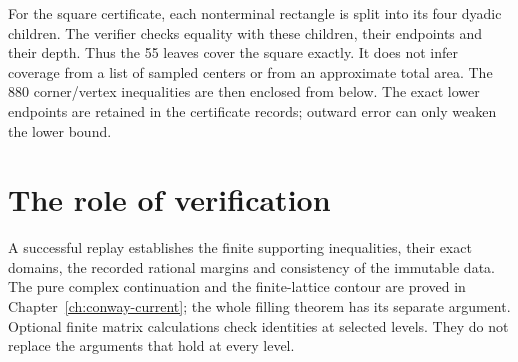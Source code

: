 For the square certificate, each nonterminal rectangle is split into its four dyadic children. The verifier checks equality with these children, their endpoints and their depth. Thus the 55 leaves cover the square exactly. It does not infer coverage from a list of sampled centers or from an approximate total area. The 880 corner/vertex inequalities are then enclosed from below. The exact lower endpoints are retained in the certificate records; outward error can only weaken the lower bound.

\section{The role of verification}
A successful replay establishes the finite supporting inequalities, their exact domains, the recorded rational margins and consistency of the immutable data. The pure complex continuation and the finite-lattice contour are proved in Chapter~\ref{ch:conway-current}; the whole filling theorem has its separate argument. Optional finite matrix calculations check identities at selected levels. They do not replace the arguments that hold at every level.
